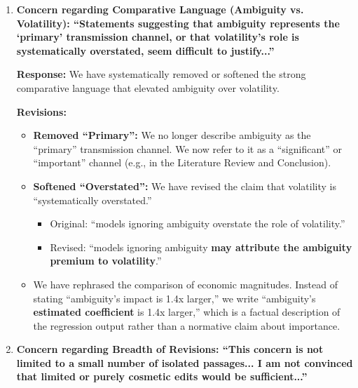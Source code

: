 \documentclass[12pt]{article}
\begin{document}
\begin{enumerate}
    \vspace{0.5cm}

    \item \textbf{Concern regarding Comparative Language (Ambiguity vs. Volatility): ``Statements suggesting that ambiguity represents the `primary' transmission channel, or that volatility's role is systematically overstated, seem difficult to justify...''}

    \begin{responsebox}
    \vspace{0.5cm}
    \textbf{Response:} We have systematically removed or softened the strong comparative language that elevated ambiguity over volatility.
    
    \textbf{Revisions:}
    \begin{itemize}
        \item \textbf{Removed ``Primary'':} We no longer describe ambiguity as the ``primary'' transmission channel. We now refer to it as a ``significant'' or ``important'' channel (e.g., in the Literature Review and Conclusion).
        \item \textbf{Softened ``Overstated'':} We have revised the claim that volatility is ``systematically overstated.''
        \begin{itemize}
            \item Original: ``models ignoring ambiguity overstate the role of volatility.''
            \item Revised: ``models ignoring ambiguity \textbf{may attribute the ambiguity premium to volatility}.''
        \end{itemize}
        \item We have rephrased the comparison of economic magnitudes. Instead of stating ``ambiguity's impact is 1.4x larger,'' we write ``ambiguity's \textbf{estimated coefficient} is 1.4x larger,'' which is a factual description of the regression output rather than a normative claim about importance.
    \end{itemize}
    \vspace{0.5cm}
    \end{responsebox}

    \vspace{0.5cm}

    \item \textbf{Concern regarding Breadth of Revisions: ``This concern is not limited to a small number of isolated passages... I am not convinced that limited or purely cosmetic edits would be sufficient...''}


\end{enumerate}
\end{document}
